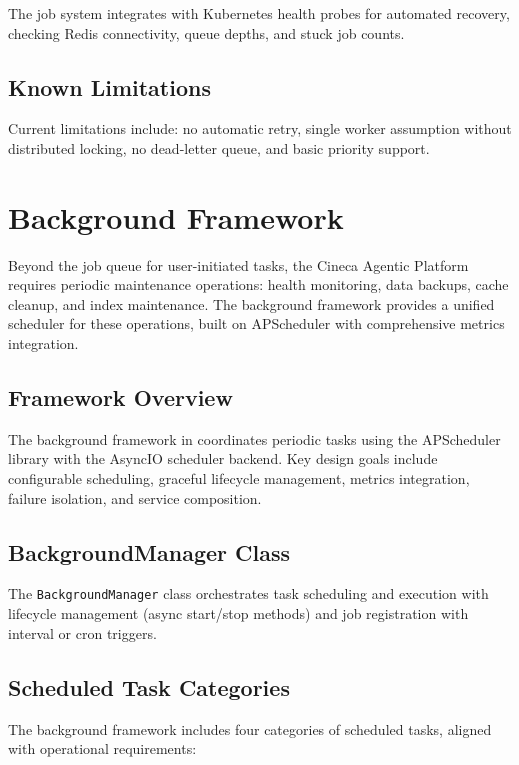 \documentclass[a4paper,twoside]{sapthesis}
\begin{document}
The job system integrates with Kubernetes health probes for automated recovery, checking Redis connectivity, queue depths, and stuck job counts.

\subsection{Known Limitations}

Current limitations include: no automatic retry, single worker assumption without distributed locking, no dead-letter queue, and basic priority support.

\section{Background Framework}
\label{sec:background-framework}

Beyond the job queue for user-initiated tasks, the Cineca Agentic Platform requires periodic maintenance operations: health monitoring, data backups, cache cleanup, and index maintenance. The background framework provides a unified scheduler for these operations, built on APScheduler with comprehensive metrics integration.

\subsection{Framework Overview}

The background framework in  coordinates periodic tasks using the APScheduler library with the AsyncIO scheduler backend. Key design goals include configurable scheduling, graceful lifecycle management, metrics integration, failure isolation, and service composition.

\subsection{BackgroundManager Class}

The \texttt{BackgroundManager} class orchestrates task scheduling and execution with lifecycle management (async start/stop methods) and job registration with interval or cron triggers.

\subsection{Scheduled Task Categories}
\label{subsec:scheduled-task-categories}

The background framework includes four categories of scheduled tasks, aligned with operational requirements:
\end{document}
